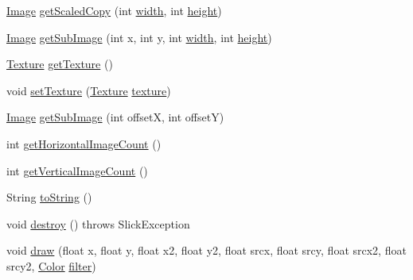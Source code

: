 \begin{DoxyCompactItemize}
\item 
\mbox{\hyperlink{classorg_1_1newdawn_1_1slick_1_1_image}{Image}} \mbox{\hyperlink{classorg_1_1newdawn_1_1slick_1_1_big_image_a9c5deeeb55882b2bbb6bfe6e2ca6c106}{get\+Scaled\+Copy}} (int \mbox{\hyperlink{classorg_1_1newdawn_1_1slick_1_1_image_a7d02c85e21b388428cfe5cc5c82714a1}{width}}, int \mbox{\hyperlink{classorg_1_1newdawn_1_1slick_1_1_image_a54397a37823bc59ddc79ec70dc5cf226}{height}})
\item 
\mbox{\hyperlink{classorg_1_1newdawn_1_1slick_1_1_image}{Image}} \mbox{\hyperlink{classorg_1_1newdawn_1_1slick_1_1_big_image_a9384aa6b99cc0b45947a5b66bf2ab19c}{get\+Sub\+Image}} (int x, int y, int \mbox{\hyperlink{classorg_1_1newdawn_1_1slick_1_1_image_a7d02c85e21b388428cfe5cc5c82714a1}{width}}, int \mbox{\hyperlink{classorg_1_1newdawn_1_1slick_1_1_image_a54397a37823bc59ddc79ec70dc5cf226}{height}})
\item 
\mbox{\hyperlink{interfaceorg_1_1newdawn_1_1slick_1_1opengl_1_1_texture}{Texture}} \mbox{\hyperlink{classorg_1_1newdawn_1_1slick_1_1_big_image_a6b527195c6230fe44a2aed4bc24b9a04}{get\+Texture}} ()
\item 
void \mbox{\hyperlink{classorg_1_1newdawn_1_1slick_1_1_big_image_a98c19cf26b95da7cc6da105672d8664c}{set\+Texture}} (\mbox{\hyperlink{interfaceorg_1_1newdawn_1_1slick_1_1opengl_1_1_texture}{Texture}} \mbox{\hyperlink{classorg_1_1newdawn_1_1slick_1_1_image_a9fd9ddb21247305c83ac4e37d9d51f79}{texture}})
\item 
\mbox{\hyperlink{classorg_1_1newdawn_1_1slick_1_1_image}{Image}} \mbox{\hyperlink{classorg_1_1newdawn_1_1slick_1_1_big_image_a9578a34140605c613f610f6f733a91d4}{get\+Sub\+Image}} (int offsetX, int offsetY)
\item 
int \mbox{\hyperlink{classorg_1_1newdawn_1_1slick_1_1_big_image_a578791d37d1539bd763d568f7223ce99}{get\+Horizontal\+Image\+Count}} ()
\item 
int \mbox{\hyperlink{classorg_1_1newdawn_1_1slick_1_1_big_image_ae0d7fee438d9892085336ea29342580d}{get\+Vertical\+Image\+Count}} ()
\item 
String \mbox{\hyperlink{classorg_1_1newdawn_1_1slick_1_1_big_image_a723c94abe07b0e3dbcb94c8d83d59c40}{to\+String}} ()
\item 
void \mbox{\hyperlink{classorg_1_1newdawn_1_1slick_1_1_big_image_a0d3d5a2b6bde50b98a7eb04bf4e1bbc2}{destroy}} ()  throws Slick\+Exception 
\item 
void \mbox{\hyperlink{classorg_1_1newdawn_1_1slick_1_1_big_image_aacb04eeb8ea255d9cddad0d9915dfc06}{draw}} (float x, float y, float x2, float y2, float srcx, float srcy, float srcx2, float srcy2, \mbox{\hyperlink{classorg_1_1newdawn_1_1slick_1_1_color}{Color}} \mbox{\hyperlink{classorg_1_1newdawn_1_1slick_1_1_image_a1c6f09687817420f3762f32bb1c3ed76}{filter}})

\end{DoxyCompactItemize}

